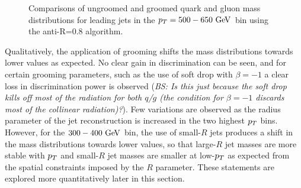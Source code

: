 \begin{figure}
\begin{center}
\caption{Comparisons of ungroomed and groomed quark and gluon mass distributions for leading jets in the 
$\pt=500-650 \GeV$ bin using the anti-\kT R=0.8 algorithm. }
\label{fig:qg_pt500_mass_AKt_R08}
\end{center}
\end{figure}
Qualitatively, the application of grooming shifts the mass distributions towards
lower values as expected. No clear gain in discrimination can be seen, and for
certain grooming parameters, such as the use of soft drop with $\beta=-1$ a clear
loss in discrimination power is observed (\emph{BS: Is this just because the soft drop
kills off most of the radiation for both $q$/$g$ (the condition for $\beta=-1$ discards most of the collinear radiation)?}).
 Few variations are observed as the 
radius parameter of the jet reconstruction is increased in the two highest $p_T$ bins. 
However, for the $300-400\GeV$ bin, the use of small-$R$ jets produces a shift in the
mass distributions towards lower values, so that large-$R$ jet masses are more stable
with $p_T$ and small-$R$ jet masses are smaller at low-$p_T$ as expected from the spatial
constraints imposed by the $R$ parameter. These statements are explored more 
quantitatively later in this section. 

